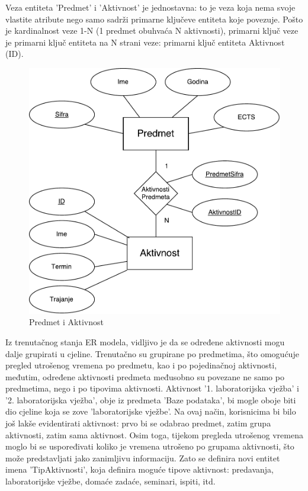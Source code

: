 \documentclass[times, utf8, zavrsni]{fer}
\begin{document}
Veza entiteta 'Predmet' i 'Aktivnost' je jednostavna: to je veza koja nema svoje vlastite atribute nego samo sadrži primarne ključeve entiteta koje povezuje. Pošto je kardinalnost veze 1-N (1 predmet obuhvaća N aktivnosti), primarni ključ veze je primarni ključ entiteta na N strani veze: primarni ključ entiteta Aktivnost (ID).

\begin{figure}[H]
\centering
\includegraphics[width=\textwidth,height=\textheight,keepaspectratio]{img/predmet-aktivnost.pdf}
\caption{Predmet i Aktivnost}
\label{fig:predmet-aktivnost}
\end{figure}

Iz trenutačnog stanja ER modela, vidljivo je da se određene aktivnosti mogu dalje grupirati u cjeline. Trenutačno su grupirane po predmetima, što omogućuje pregled utrošenog vremena po predmetu, kao i po pojedinačnoj aktivnosti, međutim, određene aktivnosti predmeta međusobno su povezane ne samo po predmetima, nego i po tipovima aktivnosti. Aktivnost '1. laboratorijska vježba' i '2. laboratorijska vježba', obje iz predmeta 'Baze podataka', bi mogle oboje biti dio cjeline koja se zove 'laboratorijske vježbe'. Na ovaj način, korisnicima bi bilo još lakše evidentirati aktivnost: prvo bi se odabrao predmet, zatim grupa aktivnosti, zatim sama aktivnost. Osim toga, tijekom pregleda utrošenog vremena moglo bi se uspoređivati koliko je vremena utrošeno po grupama aktivnosti, što može predstavljati jako zanimljivu informaciju. Zato se definira novi entitet imena 'TipAktivnosti', koja definira moguće tipove aktivnost: predavanja, laboratorijske vježbe, domaće zadaće, seminari, ispiti, itd.\\
\end{document}
